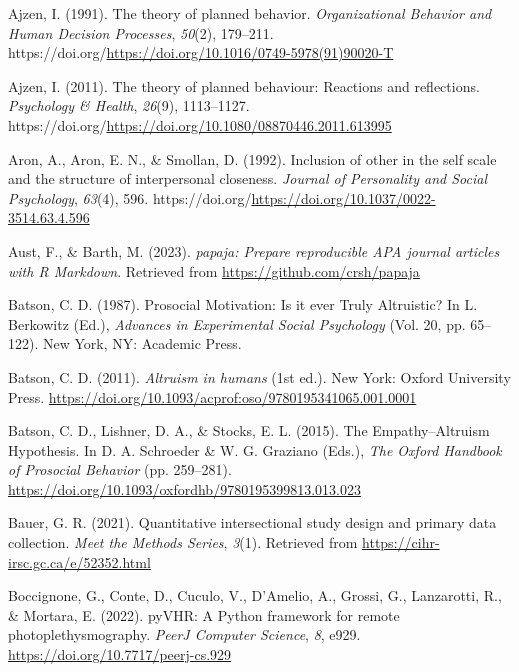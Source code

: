 \documentclass[
  man,floatsintext]{apa6}
\newlength{\cslhangindent}
\newenvironment{CSLReferences}[2] %
 {\begin{list}{}{%
  \setlength{\itemindent}{0pt}
  \setlength{\leftmargin}{0pt}
  \setlength{\parsep}{0pt}
  \ifodd #1
   \setlength{\leftmargin}{\cslhangindent}
   \setlength{\itemindent}{-1\cslhangindent}
  \fi
  \setlength{\itemsep}{#2\baselineskip}}}
 {\end{list}}
\begin{document}
\label{refs}
\begin{CSLReferences}{1}{0}
Ajzen, I. (1991). The theory of planned behavior. \emph{Organizational Behavior and Human Decision Processes}, \emph{50}(2), 179--211. https://doi.org/\url{https://doi.org/10.1016/0749-5978(91)90020-T}

Ajzen, I. (2011). The theory of planned behaviour: {Reactions} and reflections. \emph{Psychology \& Health}, \emph{26}(9), 1113--1127. https://doi.org/\url{https://doi.org/10.1080/08870446.2011.613995}

Aron, A., Aron, E. N., \& Smollan, D. (1992). Inclusion of other in the self scale and the structure of interpersonal closeness. \emph{Journal of Personality and Social Psychology}, \emph{63}(4), 596. https://doi.org/\url{https://doi.org/10.1037/0022-3514.63.4.596}

Aust, F., \& Barth, M. (2023). \emph{{papaja}: {Prepare} reproducible {APA} journal articles with {R Markdown}}. Retrieved from \url{https://github.com/crsh/papaja}

Batson, C. D. (1987). Prosocial {Motivation}: {Is} it ever {Truly} {Altruistic}? In L. Berkowitz (Ed.), \emph{Advances in {Experimental} {Social} {Psychology}} (Vol. 20, pp. 65--122). New York, NY: Academic Press.

Batson, C. D. (2011). \emph{Altruism in humans} (1st ed.). New York: Oxford University Press. \url{https://doi.org/10.1093/acprof:oso/9780195341065.001.0001}

Batson, C. D., Lishner, D. A., \& Stocks, E. L. (2015). The {Empathy}--{Altruism} {Hypothesis}. In D. A. Schroeder \& W. G. Graziano (Eds.), \emph{The {Oxford} {Handbook} of {Prosocial} {Behavior}} (pp. 259--281). \url{https://doi.org/10.1093/oxfordhb/9780195399813.013.023}

Bauer, G. R. (2021). Quantitative intersectional study design and primary data collection. \emph{Meet the Methods Series}, \emph{3}(1). Retrieved from \url{https://cihr-irsc.gc.ca/e/52352.html}

Boccignone, G., Conte, D., Cuculo, V., D'Amelio, A., Grossi, G., Lanzarotti, R., \& Mortara, E. (2022). {pyVHR}: A {Python} framework for remote photoplethysmography. \emph{PeerJ Computer Science}, \emph{8}, e929. \url{https://doi.org/10.7717/peerj-cs.929}


\end{CSLReferences}
\end{document}
